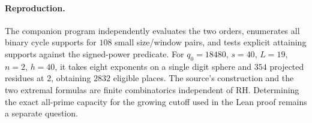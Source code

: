 \paragraph{Reproduction.}
The companion program  independently evaluates
the two orders, enumerates all binary cycle supports for $108$ small
size/window pairs, and tests explicit attaining supports against the
signed-power predicate. For $q_0=18480$, $s=40$, $L=19$, $n=2$, $h=40$,
it takes eight exponents on a single digit sphere and $354$ projected
residues at $2$, obtaining $2832$ eligible places. The source's
construction and the two extremal formulas are finite combinatorics
independent of RH. Determining the exact all-prime capacity for the
growing cutoff used in the Lean proof remains a separate question.
